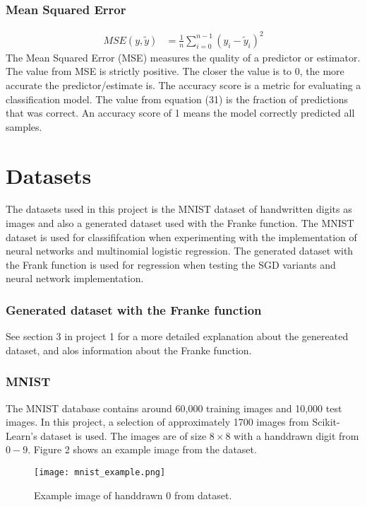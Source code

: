 \documentclass[a4paper,twocolumn]{article}
\begin{document}
\subsubsection{Mean Squared Error}
\begin{align}
        MSE(y, \widetilde{y}) &= \frac{1}{n}\sum_{i=0}^{n-1}(y_{i} - \widetilde{y}_{i})^{2}
\end{align}
The Mean Squared Error (MSE) measures the quality of a predictor or estimator. The value from MSE is strictly positive. The closer the value is to 0, the more accurate the predictor/estimate is. The accuracy score is a metric for evaluating a classification model. The value from equation (31) is the fraction of predictions that was correct. An accuracy score of 1 means the model correctly predicted all samples.
\section{Datasets}
The datasets used in this project is the MNIST dataset of handwritten digits as images and also a generated dataset used with the Franke function. The MNIST dataset is used for classififcation when experimenting with the implementation of neural networks and multinomial logistic regression. The generated dataset with the Frank function is used for regression when testing the SGD variants and neural network implementation.
\subsubsection{Generated dataset with the Franke function}
See section 3 in project 1 for a more detailed explanation about the genereated dataset, and alos information about the Franke function.\cite{project1} 
\subsubsection{MNIST}
The MNIST database contains around 60,000 training images and 10,000 test images. In this project, a selection of approximately 1700 images from Scikit-Learn's dataset is used. The images are of size $8 \times 8$ with a handdrawn digit from $0-9$. Figure 2 shows an example image from the dataset.
\begin{figure}[ht]
    \centering
    \texttt{[image: mnist\_example.png]}
    \caption{Example image of handdrawn 0 from dataset.}
\end{figure}
\end{document}
